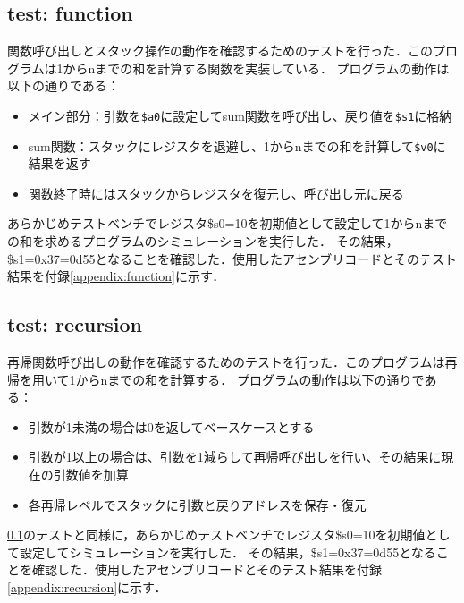 \documentclass[dvipdfmx]{jsarticle}
\begin{document}
\subsection{test: function}
\label{sec:function}
関数呼び出しとスタック操作の動作を確認するためのテストを行った．このプログラムは1からnまでの和を計算する関数を実装している．
プログラムの動作は以下の通りである：
\begin{itemize}
\item メイン部分：引数を\texttt{\$a0}に設定してsum関数を呼び出し、戻り値を\texttt{\$s1}に格納
\item sum関数：スタックにレジスタを退避し、1からnまでの和を計算して\texttt{\$v0}に結果を返す
\item 関数終了時にはスタックからレジスタを復元し、呼び出し元に戻る
\end{itemize}
あらかじめテストベンチでレジスタ\$s0=10を初期値として設定して1からnまでの和を求めるプログラムのシミュレーションを実行した．
その結果，\$s1=0x37=0d55となることを確認した．使用したアセンブリコードとそのテスト結果を付録\ref{appendix:function}に示す．

\subsection{test: recursion}
再帰関数呼び出しの動作を確認するためのテストを行った．このプログラムは再帰を用いて1からnまでの和を計算する．
プログラムの動作は以下の通りである：
\begin{itemize}
\item 引数が1未満の場合は0を返してベースケースとする
\item 引数が1以上の場合は、引数を1減らして再帰呼び出しを行い、その結果に現在の引数値を加算
\item 各再帰レベルでスタックに引数と戻りアドレスを保存・復元
\end{itemize}
\ref{sec:function}のテストと同様に，あらかじめテストベンチでレジスタ\$s0=10を初期値として設定してシミュレーションを実行した．
その結果，\$s1=0x37=0d55となることを確認した．使用したアセンブリコードとそのテスト結果を付録\ref{appendix:recursion}に示す．
\end{document}

